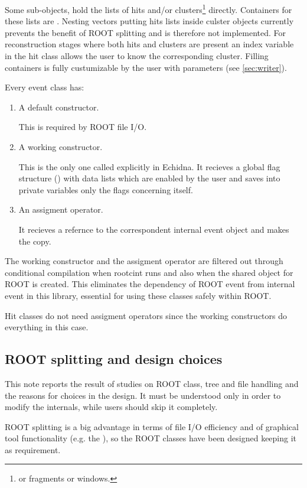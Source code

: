 Some sub-objects, hold the lists of hits and/or clusters\footnote{or fragments or windows.} directly.
Containers for these lists are .
Nesting vectors putting hits lists inside culster objects currently prevents the benefit of ROOT splitting and is therefore not implemented.
For reconstruction stages where both hits and clusters are present an index variable in the hit class allows the user to know the corresponding cluster. 
Filling containers is fully custumizable by the user with  parameters (see \ref{sec:writer}).

Every event class has:
\begin{enumerate}
\item A default constructor.

This is required by ROOT file I/O. 

\item A working constructor.

This is the only one called explicitly in Echidna. 
It recieves a global flag structure () with data lists which are enabled by the user 
and saves into private variables only the flags concerning itself.

\item An assigment operator.

It recieves a refernce to the correspondent internal event object and makes the copy.
\end{enumerate}

The working constructor and the assigment operator are filtered out through conditional compilation when rootcint runs 
and also when the shared object for ROOT is created.
This eliminates the dependency of ROOT event from internal event in this library, essential for using these classes safely within ROOT.

Hit classes do not need assigment operators since the working constructors do everything in this case.

\subsection{ROOT splitting and design choices}
\label{sec:root_split}

This note reports the result of studies on ROOT 
class, tree and file handling and the reasons for choices in the design.
It must be understood only in order to modify the internals, 
while users should skip it completely.

ROOT splitting is a big advantage in terms of file I/O efficiency and of graphical tool functionality (e.g. the ), 
so the ROOT classes have been designed keeping it as requirement.

